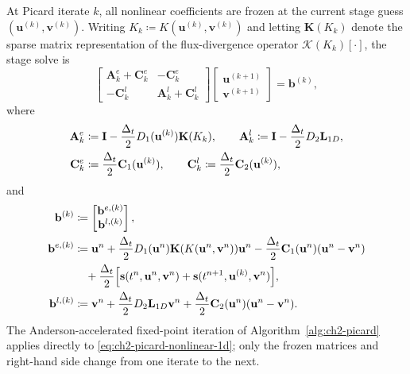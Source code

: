 At Picard iterate \(k\), all nonlinear coefficients are frozen at the current stage guess \((\mathbf{u}^{(k)},\mathbf{v}^{(k)})\). Writing \(K_k \coloneqq K(\mathbf{u}^{(k)},\mathbf{v}^{(k)})\)
and letting \(\mathbf{K}(K_k)\) denote the sparse matrix representation of the flux-divergence operator \(\mathcal{K}(K_k)[\cdot]\), the stage solve is
\begin{equation}
    \begin{bmatrix}
        \mathbf{A}^{e}_{k} + \mathbf{C}^{e}_{k} & -\mathbf{C}^{e}_{k}                     \\
        -\mathbf{C}^{l}_{k}                     & \mathbf{A}^{l}_{k} + \mathbf{C}^{l}_{k}
    \end{bmatrix}
    \begin{bmatrix}
        \mathbf{u}^{(k+1)} \\
        \mathbf{v}^{(k+1)}
    \end{bmatrix}
    =
    \mathbf{b}^{(k)},
    \label{eq:ch2-picard-nonlinear-1d}
\end{equation}
where
\begin{align}
    \mathbf{A}^{e}_{k} & \coloneqq \mathbf{I} - \frac{\Delta_t}{2} D_1(\mathbf{u}^{(k)}) \mathbf{K}(K_k), \qquad
    \mathbf{A}^{l}_{k} \coloneqq \mathbf{I} - \frac{\Delta_t}{2} D_2 \mathbf{L}_{1D}, \notag                     \\
    \mathbf{C}^{e}_{k} & \coloneqq \frac{\Delta_t}{2}\mathbf{C}_1(\mathbf{u}^{(k)}), \qquad
    \mathbf{C}^{l}_{k}
    \coloneqq
    \frac{\Delta_t}{2}\mathbf{C}_2(\mathbf{u}^{(k)}),
    \notag
\end{align}
and
\begin{align}
    \mathbf{b}^{(k)}
     & \coloneqq
    \begin{bmatrix}
        \mathbf{b}^{e,(k)} \\
        \mathbf{b}^{l,(k)}
    \end{bmatrix},
    \notag       \\
    \mathbf{b}^{e,(k)}
     & \coloneqq
    \mathbf{u}^{n}
    +
    \frac{\Delta_t}{2}
    D_1(\mathbf{u}^{n})\mathbf{K}(K(\mathbf{u}^{n},\mathbf{v}^{n}))\mathbf{u}^{n}
    -
    \frac{\Delta_t}{2}
    \mathbf{C}_1(\mathbf{u}^{n})(\mathbf{u}^{n}-\mathbf{v}^{n})
    \notag       \\
     & \quad
    +
    \frac{\Delta_t}{2}
    \Bigl[
        \mathbf{s}(t^{n},\mathbf{u}^{n},\mathbf{v}^{n})
        +
        \mathbf{s}(t^{n+1},\mathbf{u}^{(k)},\mathbf{v}^{n})
        \Bigr],
    \notag       \\
    \mathbf{b}^{l,(k)}
     & \coloneqq
    \mathbf{v}^{n}
    +
    \frac{\Delta_t}{2}
    D_2 \mathbf{L}_{1D}\mathbf{v}^{n}
    +
    \frac{\Delta_t}{2}
    \mathbf{C}_2(\mathbf{u}^{n})(\mathbf{u}^{n}-\mathbf{v}^{n}).
    \notag
\end{align}
The Anderson-accelerated fixed-point iteration of Algorithm~\ref{alg:ch2-picard} applies directly to \eqref{eq:ch2-picard-nonlinear-1d}; only the frozen matrices and right-hand side change from one iterate to the next.

